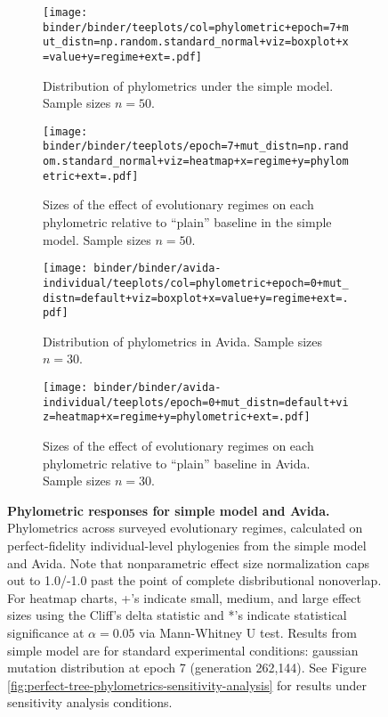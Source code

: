 \begin{figure*}
  \centering
  \begin{subfigure}[b]{\textwidth}
    \texttt{[image: binder/binder/teeplots/col=phylometric+epoch=7+mut\_distn=np.random.standard\_normal+viz=boxplot+x=value+y=regime+ext=.pdf]}
  \caption{%
    Distribution of phylometrics under the simple model.
    Sample sizes $n=50$.
  }
  \label{fig:perfect-tree-phylometrics-simple-boxplot}
  \end{subfigure}

  \begin{subfigure}[b]{\textwidth}
    \texttt{[image: binder/binder/teeplots/epoch=7+mut\_distn=np.random.standard\_normal+viz=heatmap+x=regime+y=phylometric+ext=.pdf]}
    \caption{
 Sizes of the effect of evolutionary regimes on each phylometric relative to ``plain'' baseline in the simple model.
    Sample sizes $n=50$.
    }
\label{fig:perfect-tree-phylometrics-simple-heatmap}
  \end{subfigure}%

\begin{subfigure}[b]{\textwidth}
  \texttt{[image: binder/binder/avida-individual/teeplots/col=phylometric+epoch=0+mut\_distn=default+viz=boxplot+x=value+y=regime+ext=.pdf]}
  \caption{
  Distribution of phylometrics in Avida.
  Sample sizes $n=30$.
  }
  \label{fig:perfect-tree-phylometrics-avida-boxplot}
\end{subfigure}%

\begin{subfigure}[b]{\textwidth}
  \texttt{[image: binder/binder/avida-individual/teeplots/epoch=0+mut\_distn=default+viz=heatmap+x=regime+y=phylometric+ext=.pdf]}
\caption{%
   Sizes of the effect of evolutionary regimes on each phylometric relative to ``plain'' baseline in Avida. Sample sizes $n=30$.
}
\label{fig:perfect-tree-phylometrics-avida-heatmap}
\end{subfigure}

  \caption{%
  \textbf{Phylometric responses for simple model and Avida.}
  Phylometrics across surveyed evolutionary regimes, calculated on perfect-fidelity individual-level phylogenies from the simple model and Avida.
  Note that nonparametric effect size normalization caps out to 1.0/-1.0 past the point of complete disbributional nonoverlap.
  For heatmap charts, +'s indicate small, medium, and large effect sizes using the Cliff's delta statistic and *'s indicate statistical significance at $\alpha = 0.05$ via Mann-Whitney U test.
  Results from simple model are for standard experimental conditions: gaussian mutation distribution at epoch 7 (generation 262,144).
  See Figure \ref{fig:perfect-tree-phylometrics-sensitivity-analysis} for results under sensitivity analysis conditions.
  }
  \label{fig:perfect-tree-phylometrics}
\end{figure*}